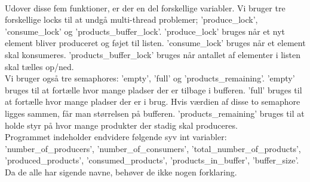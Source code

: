 \\Udover disse fem funktioner, er der en del forskellige variabler. Vi bruger tre forskellige locks til at undgå multi-thread problemer; 'produce_lock', 'consume_lock' og 'products_buffer_lock'. 'produce_lock' bruges når et nyt element bliver produceret og føjet til listen. 'consume_lock' bruges når et element skal konsumeres. 'products_buffer_lock' bruges når antallet af elementer i listen skal tælles op/ned.
\\Vi bruger også tre semaphores: 'empty', 'full' og 'products_remaining'. 'empty' bruges til at fortælle hvor mange pladser der er tilbage i bufferen. 'full' bruges til at fortælle hvor mange pladser der er i brug. Hvis værdien af disse to semaphore ligges sammen, får man størrelsen på bufferen. 'products_remaining' bruges til at holde styr på hvor mange produkter der stadig skal produceres.
\\Programmet indeholder endvidere følgende syv int variabler: 'number_of_producers', 'number_of_consumers', 'total_number_of_products', 'produced_products', 'consumed_products', 'products_in_buffer', 'buffer_size'. Da de alle har sigende navne, behøver de ikke nogen forklaring.

